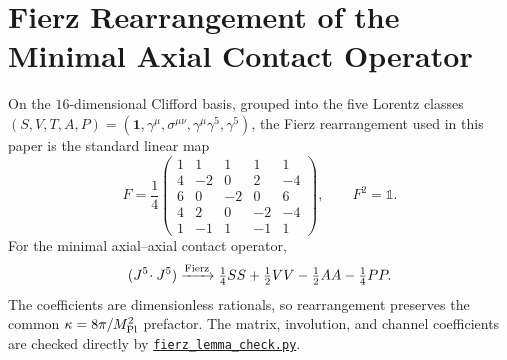 \documentclass[aps,prd,twocolumn,superscriptaddress,showpacs,preprintnumbers,nofootinbib,longbibliography,floatfix]{revtex4-2}
\newcommand{\MPl}{M_{\rm Pl}}
\newcommand{\artifactnamed}[2]{\href{https://github.com/Hubify-Projects/bigbounce/blob/main/#1}{\nolinkurl{#2}}}
\begin{document}

\section{Fierz Rearrangement of the Minimal Axial Contact Operator}
\label{app:fierz}

On the $16$-dimensional Clifford basis, grouped into the five Lorentz classes
$(S,V,T,A,P)=(\mathbf 1,\gamma^\mu,\sigma^{\mu\nu},
\gamma^\mu\gamma^5,\gamma^5)$, the Fierz rearrangement used in this paper is
the standard linear map~\cite{ItzyksonZuber,NievesPal2004}
\begin{equation}\label{eq:fierzmatrix}
F=\frac14\!\begin{pmatrix}
1&1&1&1&1\\ 4&-2&0&2&-4\\ 6&0&-2&0&6\\
4&2&0&-2&-4\\ 1&-1&1&-1&1
\end{pmatrix},\qquad F^2=\mathbb 1.
\end{equation}
For the minimal axial--axial contact operator,
\begin{equation}\label{eq:AAdecomp}
(J^5\!\cdot J^5)\xrightarrow{\rm Fierz}
\tfrac14 SS+\tfrac12 VV-\tfrac12 AA-\tfrac14 PP.
\end{equation}
The coefficients are dimensionless rationals, so rearrangement preserves the
common $\kappa=8\pi/M_{\rm Pl}^{2}$ prefactor.  The matrix, involution, and channel
coefficients are checked directly by
\artifactnamed{arxiv/scripts/fierz_lemma_check.py}{fierz_lemma_check.py}.
\end{document}
